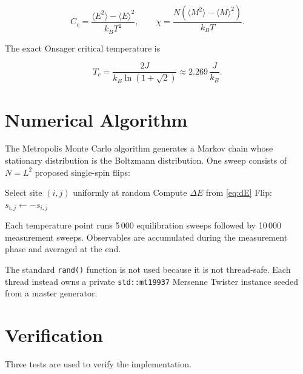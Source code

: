 \documentclass[conference]{IEEEtran}
\begin{document}
\begin{equation}
  C_v = \frac{\langle E^2\rangle - \langle E\rangle^2}{k_B T^2},
  \qquad
  \chi = \frac{N\!\left(\langle M^2\rangle - \langle M\rangle^2\right)}{k_B T}.
  \label{eq:cv_chi}
\end{equation}

The exact Onsager critical temperature \cite{onsager1944} is

\begin{equation}
  T_c = \frac{2J}{k_B\ln(1+\sqrt{2})} \approx 2.269\,\frac{J}{k_B}.
  \label{eq:tc}
\end{equation}

\section{Numerical Algorithm}

The Metropolis Monte Carlo algorithm \cite{metropolis1953} generates a Markov
chain whose stationary distribution is the Boltzmann distribution. One sweep
consists of $N = L^2$ proposed single-spin flips:

\begin{algorithm}
\caption{Metropolis sweep}
\begin{algorithmic}[1]
  \STATE Select site $(i,j)$ uniformly at random
  \STATE Compute $\Delta E$ from \eqref{eq:dE}
    \STATE Flip: $s_{i,j} \leftarrow -s_{i,j}$
  \ENDIF
\ENDFOR
\end{algorithmic}
\end{algorithm}

Each temperature point runs 5\,000 equilibration sweeps followed by
10\,000 measurement sweeps. Observables are accumulated during the
measurement phase and averaged at the end.

The standard \texttt{rand()} function is not used because it is not
thread-safe. Each thread instead owns a private \texttt{std::mt19937}
Mersenne Twister instance seeded from a master generator.

\section{Verification}

Three tests are used to verify the implementation.
\end{document}
